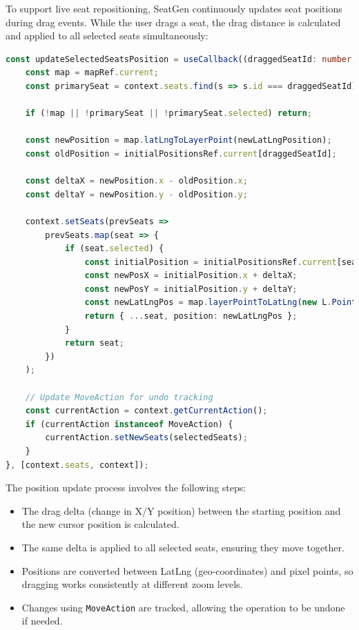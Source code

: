 To support live seat repositioning, SeatGen continuously updates seat positions during drag events. While the user drags a seat, the drag distance is calculated and applied to all selected seats simultaneously:

\begin{lstlisting}[language=TypeScript, caption=Updating Seat Positions During Dragging, label=lst:seat-live-dragging]
const updateSelectedSeatsPosition = useCallback((draggedSeatId: number, newLatLngPosition: { lat: number; lng: number }) => {
    const map = mapRef.current;
    const primarySeat = context.seats.find(s => s.id === draggedSeatId);

    if (!map || !primarySeat || !primarySeat.selected) return;

    const newPosition = map.latLngToLayerPoint(newLatLngPosition);
    const oldPosition = initialPositionsRef.current[draggedSeatId];

    const deltaX = newPosition.x - oldPosition.x;
    const deltaY = newPosition.y - oldPosition.y;

    context.setSeats(prevSeats =>
        prevSeats.map(seat => {
            if (seat.selected) {
                const initialPosition = initialPositionsRef.current[seat.id];
                const newPosX = initialPosition.x + deltaX;
                const newPosY = initialPosition.y + deltaY;
                const newLatLngPos = map.layerPointToLatLng(new L.Point(newPosX, newPosY));
                return { ...seat, position: newLatLngPos };
            }
            return seat;
        })
    );

    // Update MoveAction for undo tracking
    const currentAction = context.getCurrentAction();
    if (currentAction instanceof MoveAction) {
        currentAction.setNewSeats(selectedSeats);
    }
}, [context.seats, context]);
\end{lstlisting}

The position update process involves the following steps:
\begin{itemize}
    \item The drag delta (change in X/Y position) between the starting position and the new cursor position is calculated.
    \item The same delta is applied to all selected seats, ensuring they move together.
    \item Positions are converted between LatLng (geo-coordinates) and pixel points, so dragging works consistently at different zoom levels.
    \item Changes using \texttt{MoveAction} are tracked, allowing the operation to be undone if needed.
\end{itemize}

